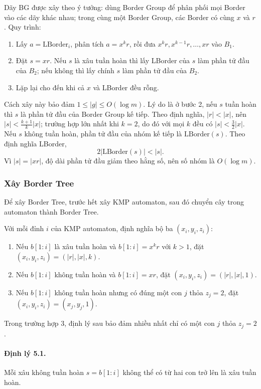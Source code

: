 \documentclass[11pt]{article}
\begin{document}
Dãy BG được xây theo ý tưởng: dùng Border Group để phân phối mọi Border vào các
dãy khác nhau; trong cùng một Border Group, các Border có cùng \(x\) và \(r\).
Quy trình:
\begin{enumerate}
  \item Lấy \(a=\mathrm{LBorder}_i\), phân tích \(a=x^kr\), rồi đưa
  \(x^kr,x^{k-1}r,\ldots,xr\) vào \(B_1\).
  \item Đặt \(s=xr\). Nếu \(s\) là xâu tuần hoàn thì lấy LBorder của \(s\) làm
  phần tử đầu của \(B_2\); nếu không thì lấy chính \(s\) làm phần tử đầu của
  \(B_2\).
  \item Lặp lại cho đến khi cả \(x\) và LBorder đều rỗng.
\end{enumerate}

Cách xây này bảo đảm \(1\le |g|\le O(\log m)\). Lý do là ở bước 2, nếu \(s\)
tuần hoàn thì \(s\) là phần tử đầu của Border Group kế tiếp. Theo định nghĩa,
\(|r|<|x|\), nên \(|s|<\frac{k+1}{k}|x|\); trường hợp lớn nhất khi \(k=2\), do
đó với mọi \(k\) đều có \(|s|<\frac32|x|\). Nếu \(s\) không tuần hoàn, phần tử
đầu của nhóm kế tiếp là \(\mathrm{LBorder}(s)\). Theo định nghĩa LBorder,
\[
  2|\mathrm{LBorder}(s)|<|s|.
\]
Vì \(|s|=|xr|\), độ dài phần tử đầu giảm theo hằng số, nên số nhóm là
\(O(\log m)\).

\subsubsection{Xây Border Tree}

Để xây Border Tree, trước hết xây KMP automaton, sau đó chuyển cây trong
automaton thành Border Tree.

Với mỗi đỉnh \(i\) của KMP automaton, định nghĩa bộ ba \((x_i,y_i,z_i)\):
\begin{enumerate}
  \item Nếu \(b[1:i]\) là xâu tuần hoàn và \(b[1:i]=x^kr\) với \(k>1\), đặt
  \((x_i,y_i,z_i)=(|r|,|x|,k)\).
  \item Nếu \(b[1:i]\) không tuần hoàn và \(b[1:i]=xr\), đặt
  \((x_i,y_i,z_i)=(|r|,|x|,1)\).
  \item Nếu \(b[1:i]\) không tuần hoàn nhưng có đúng một con \(j\) thỏa
  \(z_j=2\), đặt \((x_i,y_i,z_i)=(x_j,y_j,1)\).
\end{enumerate}

Trong trường hợp 3, định lý sau bảo đảm nhiều nhất chỉ có một con \(j\) thỏa
\(z_j=2\).

\paragraph{Định lý 5.1.}
Mỗi xâu không tuần hoàn \(s=b[1:i]\) không thể có từ hai con trở lên là xâu tuần
hoàn.
\end{document}
